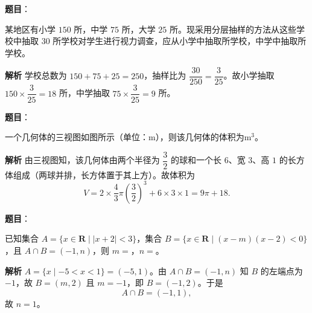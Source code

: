 \begin{answer}

\textbf{题目}：

某地区有小学 $150$ 所，中学 $75$ 所，大学 $25$ 所。现采用分层抽样的方法从这些学校中抽取 $30$ 所学校对学生进行视力调查，应从小学中抽取\gkblank{}所学校，中学中抽取\gkblank{}所学校。

\textbf{解析}
学校总数为 $150+75+25=250$，抽样比为 $\dfrac{30}{250}=\dfrac3{25}$。故小学抽取 $150\times\dfrac3{25}=18$ 所，中学抽取 $75\times\dfrac3{25}=9$ 所。


\end{answer}
\begin{answer}

\textbf{题目}：

一个几何体的三视图如图所示（单位：$\mathrm m$），则该几何体的体积为\gkblank{}$\mathrm m^3$。
\nopagebreak[4]
\begin{center}\end{center}
\nopagebreak[4]
\textbf{解析}
由三视图知，该几何体由两个半径为 $\dfrac32$ 的球和一个长 $6$、宽 $3$、高 $1$ 的长方体组成（两球并排，长方体置于其上方）。故体积为
\nopagebreak[4]
\[V=2\times\frac43\pi\left(\frac32\right)^3+6\times3\times1=9\pi+18.\]


\end{answer}
\begin{answer}

\textbf{题目}：

已知集合 $A=\{x\in\mathbf R\mid|x+2|<3\}$，集合 $B=\{x\in\mathbf R\mid(x-m)(x-2)<0\}$，且 $A\cap B=(-1,n)$，则 $m=$\gkblank{}，$n=$\gkblank{}。

\textbf{解析}
$A=\{x\mid-5<x<1\}=(-5,1)$。由 $A\cap B=(-1,n)$ 知 $B$ 的左端点为 $-1$，故 $B=(m,2)$ 且 $m=-1$，即 $B=(-1,2)$。于是
\nopagebreak[4]
\[A\cap B=(-1,1),\]
故 $n=1$。


\end{answer}
